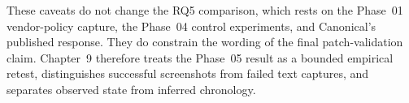 These caveats do not change the RQ5 comparison, which rests on the Phase~01
vendor-policy capture, the Phase~04 control experiments, and Canonical's
published response. They do constrain the wording of the final patch-validation
claim. Chapter~9 therefore treats the Phase~05 result as a bounded empirical
retest, distinguishes successful screenshots from failed text captures, and
separates observed state from inferred chronology.